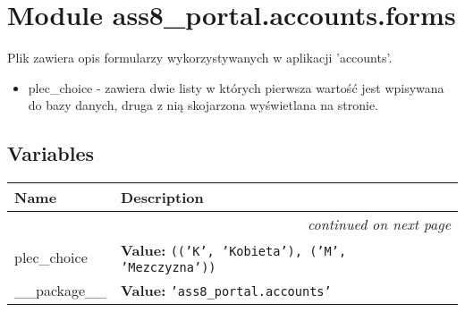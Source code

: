 %
%
%


\section{Module ass8\_portal.accounts.forms}

    \label{ass8_portal:accounts:forms}
Plik zawiera opis formularzy wykorzystywanych w aplikacji 'accounts'.

\begin{itemize}
\setlength{\parskip}{0.6ex}
  \item plec\_choice - zawiera dwie listy w których pierwsza wartość jest 
    wpisywana do bazy danych, druga z nią skojarzona wyświetlana na 
    stronie.

\end{itemize}



  \subsection{Variables}

    \vspace{-1cm}
\hspace{\varindent}\begin{longtable}{|p{\varnamewidth}|p{\vardescrwidth}|l}
\cline{1-2}
\cline{1-2} \centering \textbf{Name} & \centering \textbf{Description}& \\
\cline{1-2}
\endhead\cline{1-2}\multicolumn{3}{r}{\small\textit{continued on next page}}\\\endfoot\cline{1-2}
\endlastfoot\raggedright p\-l\-e\-c\-\_\-c\-h\-o\-i\-c\-e\- & \raggedright \textbf{Value:} 
{\tt \texttt{(}\texttt{(}\texttt{'}\texttt{K}\texttt{'}\texttt{, }\texttt{'}\texttt{Kobieta}\texttt{'}\texttt{)}\texttt{, }\texttt{(}\texttt{'}\texttt{M}\texttt{'}\texttt{, }\texttt{'}\texttt{Mezczyzna}\texttt{'}\texttt{)}\texttt{)}}&\\
\cline{1-2}
\raggedright \_\-\_\-p\-a\-c\-k\-a\-g\-e\-\_\-\_\- & \raggedright \textbf{Value:} 
{\tt \texttt{'}\texttt{ass8\_portal.accounts}\texttt{'}}&\\
\cline{1-2}
\end{longtable}


